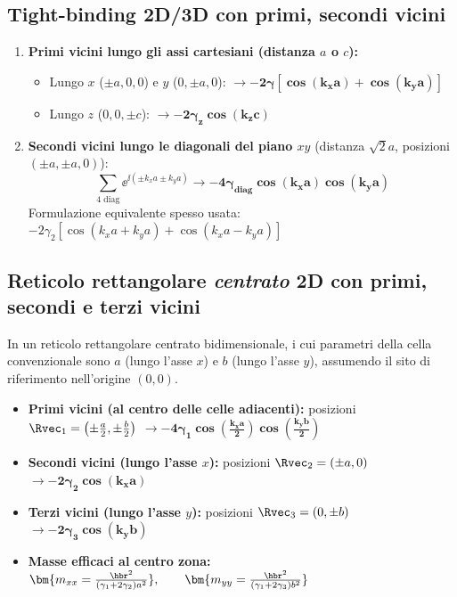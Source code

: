 \subsection{Tight-binding 2D/3D con primi, secondi vicini}
\begin{enumerate}
    \item \textbf{Primi vicini lungo gli assi cartesiani (distanza $a$ o $c$):}
    \begin{itemize}
        \item Lungo $x$ ($\pm a,0,0$) e $y$ ($0,\pm a,0$): $\rightarrow \bm{-2\gamma[\cos(k_x a)+\cos(k_y a)]}$
        \item Lungo $z$ ($0,0,\pm c$): $\rightarrow \bm{-2\gamma_z\cos(k_z c)}$
    \end{itemize}
    \item \textbf{Secondi vicini lungo le diagonali del piano $xy$} (distanza $\sqrt2 a$, posizioni $(\pm a,\pm a,0)$): 
    \[ \sum_{\text{4 diag}}\ee^{\ii(\pm k_xa\pm k_ya)} \longrightarrow \bm{-4\gamma_{diag}\cos(k_xa)\cos(k_ya)} \]
    Formulazione equivalente spesso usata: $-2\gamma_2\left[\cos(k_xa+k_ya)+\cos(k_xa-k_ya)\right]$

\end{enumerate}

\subsection{Reticolo rettangolare \textit{centrato} 2D con primi, secondi e terzi vicini}
In un reticolo rettangolare centrato bidimensionale, i cui parametri della cella convenzionale sono $a$ (lungo l'asse $x$) e $b$ (lungo l'asse $y$), assumendo il sito di riferimento nell'origine $(0,0)$.
\begin{itemize}
    \item \textbf{Primi vicini (al centro delle celle adiacenti):} posizioni $\Rvec_1 = \left(\pm\frac{a}{2}, \pm\frac{b}{2}\right)$ 
     $\rightarrow 
 \bm{-4\gamma_1\cos\!\left(\frac{k_x a}{2}\right)\cos\!\left(\frac{k_y b}{2}\right)} $
    \item \textbf{Secondi vicini (lungo l'asse $x$):} posizioni $\Rvec_2 = (\pm a, 0)$  $\rightarrow \bm{-2\gamma_2\cos(k_x a)} $
    \item \textbf{Terzi vicini (lungo l'asse $y$):} posizioni $\Rvec_3 = (0, \pm b)$ $ \rightarrow \bm{-2\gamma_3\cos(k_y b)} $
    \item \textbf{Masse efficaci al centro zona:}  $\bm{m_{xx} = \frac{\hbr^2}{(\gamma_1+2\gamma_2)a^2}}, \qquad \bm{m_{yy} = \frac{\hbr^2}{(\gamma_1+2\gamma_3)b^2}}$
\end{itemize}

